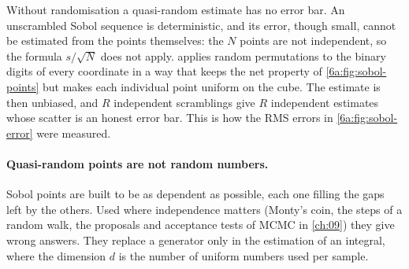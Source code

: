 Without randomisation a quasi-random estimate has no error bar. An unscrambled
Sobol sequence is deterministic, and its error, though small, cannot be estimated
from the points themselves: the $N$ points are not independent, so the
formula $s/\sqrt N$ does not apply.  applies random
permutations to the binary digits of every coordinate in a way that keeps the net
property of \cref{6a:fig:sobol-points} but makes each individual point uniform on the
cube. The estimate is then unbiased, and $R$ independent scramblings give $R$
independent estimates whose scatter is an honest error bar. This is how the RMS
errors in \cref{6a:fig:sobol-error} were measured.

\paragraph{Quasi-random points are not random numbers.}
Sobol points are built to be as dependent as possible, each one filling the gaps
left by the others. Used where independence matters (Monty's coin, the steps of a
random walk, the proposals and acceptance tests of MCMC in \cref{ch:09}) they give
wrong answers. They replace a generator only in the estimation of an integral,
where the dimension $d$ is the number of uniform numbers used per sample.

